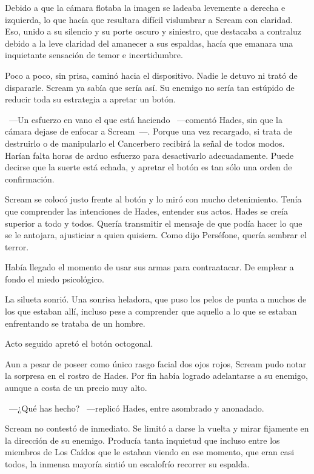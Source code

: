 Debido a que la cámara flotaba la imagen se ladeaba levemente a derecha e izquierda, lo que hacía que resultara difícil vislumbrar a Scream con claridad. Eso, unido a su silencio y su porte oscuro y siniestro, que destacaba a contraluz debido a la leve claridad del amanecer a sus espaldas, hacía que emanara una inquietante sensación de temor e incertidumbre.

Poco a poco, sin prisa, caminó hacia el dispositivo. Nadie le detuvo ni trató de dispararle. Scream ya sabía que sería así. Su enemigo no sería tan estúpido de reducir toda su estrategia a apretar un botón.

~---Un esfuerzo en vano el que está haciendo ~---comentó Hades, sin que la cámara dejase de enfocar a Scream~---. Porque una vez recargado, si trata de destruirlo o de manipularlo el Cancerbero recibirá la señal de todos modos. Harían falta horas de arduo esfuerzo para desactivarlo adecuadamente. Puede decirse que la suerte está echada, y apretar el botón es tan sólo una orden de confirmación.

Scream se colocó justo frente al botón y lo miró con mucho detenimiento. Tenía que comprender las intenciones de Hades, entender sus actos. Hades se creía superior a todo y todos. Quería transmitir el mensaje de que podía hacer lo que se le antojara, ajusticiar a quien quisiera. Como dijo Perséfone, quería sembrar el terror.

Había llegado el momento de usar sus armas para contraatacar. De emplear a fondo el miedo psicológico.

La silueta sonrió. Una sonrisa heladora, que puso los pelos de punta a muchos de los que estaban allí, incluso pese a comprender que aquello a lo que se estaban enfrentando se trataba de un hombre.

Acto seguido apretó el botón octogonal.

Aun a pesar de poseer como único rasgo facial dos ojos rojos, Scream pudo notar la sorpresa en el rostro de Hades. Por fin había logrado adelantarse a su enemigo, aunque a costa de un precio muy alto.

~---¿Qué has hecho? ~---replicó Hades, entre asombrado y anonadado.

Scream no contestó de inmediato. Se limitó a darse la vuelta y mirar fijamente en la dirección de su enemigo. Producía tanta inquietud que incluso entre los miembros de Los Caídos que le estaban viendo en ese momento, que eran casi todos, la inmensa mayoría sintió un escalofrío recorrer su espalda.

